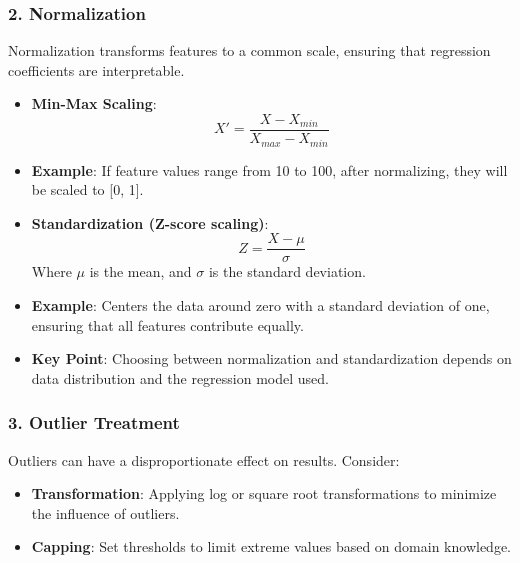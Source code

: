 \documentclass{beamer}
\begin{document}
\begin{frame}[fragile]
    \frametitle{2. Normalization}
    Normalization transforms features to a common scale, ensuring that regression coefficients are interpretable.
    
    \begin{itemize}
        \item \textbf{Min-Max Scaling}: 
        \begin{equation}
            X' = \frac{X - X_{min}}{X_{max} - X_{min}}
        \end{equation}
        \item \textbf{Example}: If feature values range from 10 to 100, after normalizing, they will be scaled to [0, 1].
        
        \item \textbf{Standardization (Z-score scaling)}:
        \begin{equation}
            Z = \frac{X - \mu}{\sigma}
        \end{equation}
        Where \( \mu \) is the mean, and \( \sigma \) is the standard deviation.
        
        \item \textbf{Example}: Centers the data around zero with a standard deviation of one, ensuring that all features contribute equally.
        
        \item \textbf{Key Point}: Choosing between normalization and standardization depends on data distribution and the regression model used.
    \end{itemize}
\end{frame}

\begin{frame}[fragile]
    \frametitle{3. Outlier Treatment}
    Outliers can have a disproportionate effect on results. Consider:
    
    \begin{itemize}
        \item \textbf{Transformation}: Applying log or square root transformations to minimize the influence of outliers.
        \item \textbf{Capping}: Set thresholds to limit extreme values based on domain knowledge.
    \end{itemize}
\end{frame}
\end{document}
